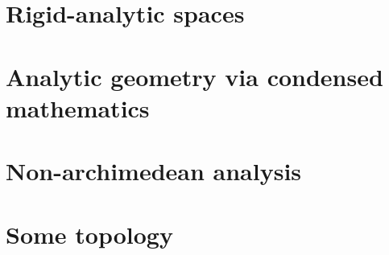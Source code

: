         \chapter{Rigid-analytic spaces}
            \begin{abstract}
                
            \end{abstract}
            
            \minitoc
            
            
            
            
            
        \chapter{Analytic geometry via condensed mathematics}
            \begin{abstract}
            
            \end{abstract}
            
            \minitoc
            
            
            
            

        \begin{appendices}
            \chapter{Non-archimedean analysis}
                \begin{abstract}
                    
                \end{abstract}
                
                \minitoc
        
            \chapter{Some topology}
                \begin{abstract}
                    
                \end{abstract}
                
                \minitoc
                
                
                
                
                
                
        \end{appendices}


